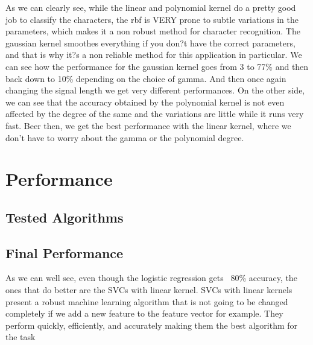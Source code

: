 \documentclass{article}
\begin{document}
As we can clearly see, while the linear and polynomial kernel do a pretty good job to classify the characters, the rbf is VERY prone to subtle variations in the parameters, which makes it a non robust method for character recognition. The gaussian kernel smoothes everything if you don?t have the correct parameters, and that is why it?s a non reliable method for this application in particular. We can see how the performance for the gaussian kernel goes from 3 to 77\% and then back down to 10\% depending on the choice of gamma. And then once again changing the signal length we get very different performances.
On the other side, we can see that the accuracy obtained by the polynomial kernel is not even affected by the degree of the same and the variations are little while it runs very fast. Beer then, we get the best performance with the linear kernel, where we don't have to worry about the gamma or the polynomial degree.


\section{Performance}
\subsection{Tested Algorithms}

\subsection{Final Performance}

 As we can well see, even though the logistic regression gets ~80\% accuracy, the ones that do better are the SVCs with linear kernel. SVCs with linear kernels present a robust machine learning algorithm that is not going to be changed completely if we add a new feature to the feature vector for example. They perform quickly, efficiently, and accurately making them the best algorithm for the task
\end{document}
